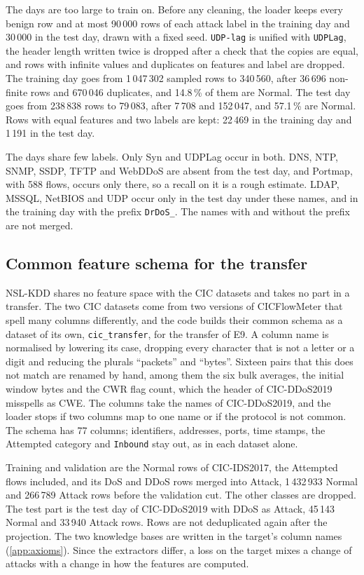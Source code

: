 The days are too large to train on. Before any cleaning, the loader keeps every benign row and
at most 90\,000 rows of each attack label in the training day and 30\,000 in the test day, drawn
with a fixed seed. \texttt{UDP-lag} is unified with \texttt{UDPLag}, the header length written
twice is dropped after a check that the copies are equal, and rows with infinite values and
duplicates on features and label are dropped. The training day goes
from 1\,047\,302 sampled rows to 340\,560, after 36\,696 non-finite rows and 670\,046
duplicates, and 14.8\,\% of them are Normal. The test day goes from 238\,838 rows to 79\,083,
after 7\,708 and 152\,047, and 57.1\,\% are Normal. Rows with equal features and two labels
are kept: 22\,469 in the training day and 1\,191 in the test day.

The days share few labels. Only Syn and UDPLag occur in both. DNS, NTP, SNMP, SSDP, TFTP and
WebDDoS are absent from the test day, and Portmap, with 588 flows, occurs only there, so a recall on it
is a rough estimate. LDAP, MSSQL, NetBIOS and UDP occur only in the test day under these names,
and in the training day with the prefix \texttt{DrDoS\_}. The names with and without the prefix
are not merged.

\subsection{Common feature schema for the transfer}
\label{sec:impl-schema}

NSL-KDD shares no feature space with the CIC datasets and takes no part in a transfer. The two
CIC datasets come from two versions of CICFlowMeter that spell many columns differently, and the
code builds their common schema as a dataset of its own, \texttt{cic\_transfer}, for the
transfer of E9. A column name is normalised by lowering its case, dropping every character that
is not a letter or a digit and reducing the plurals ``packets'' and ``bytes''. Sixteen pairs that
this does not match are renamed by hand, among them the six bulk averages, the initial window
bytes and the CWR flag count, which the header of CIC-DDoS2019 misspells as CWE. The columns take
the names of CIC-DDoS2019, and the loader stops if two columns map to one name or if the protocol
is not common. The schema has 77 columns; identifiers, addresses, ports, time stamps, the
Attempted category and \texttt{Inbound} stay out, as in each dataset alone.

Training and validation are the Normal rows of CIC-IDS2017, the Attempted flows included, and its
DoS and DDoS rows merged into Attack, 1\,432\,933 Normal and 266\,789 Attack rows before the validation cut.
The other classes are dropped. The test part is the test day of CIC-DDoS2019 with DDoS as Attack,
45\,143 Normal and 33\,940 Attack rows. Rows are not deduplicated again after the projection. The two knowledge bases are written in
the target's column names (\cref{app:axioms}). Since the extractors differ, a loss on the target
mixes a change of attacks with a change in how the features are computed.

